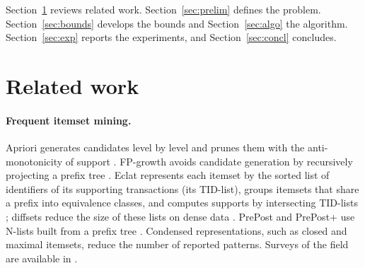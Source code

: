 \documentclass[pdflatex,sn-mathphys,Numbered]{sn-jnl}
\theoremstyle{thmstyleone}
\theoremstyle{thmstyletwo}
\theoremstyle{thmstylethree}
\begin{document}
Section~\ref{sec:related} reviews related work. Section~\ref{sec:prelim} defines the problem. Section~\ref{sec:bounds} develops the bounds and Section~\ref{sec:algo} the algorithm. Section~\ref{sec:exp} reports the experiments, and Section~\ref{sec:concl} concludes.

\section{Related work}\label{sec:related}

\paragraph{Frequent itemset mining.}
Apriori generates candidates level by level and prunes them with the anti-monotonicity of support \cite{agrawal1993mining,agrawal1994fast}. FP-growth avoids candidate generation by recursively projecting a prefix tree \cite{han2000mining}. Eclat represents each itemset by the sorted list of identifiers of its supporting transactions (its TID-list), groups itemsets that share a prefix into equivalence classes, and computes supports by intersecting TID-lists \cite{zaki1997new,zaki2000scalable}; diffsets reduce the size of these lists on dense data \cite{zaki2003diffsets}. PrePost and PrePost+ use N-lists built from a prefix tree \cite{deng2012nlist,deng2015prepost}. Condensed representations, such as closed \cite{pasquier1999closed,zaki2002charm,uno2004lcm} and maximal \cite{bayardo1998maxminer} itemsets, reduce the number of reported patterns. Surveys of the field are available in \cite{aggarwal2014frequent,fournier2017survey,luna2019review}.
\end{document}
